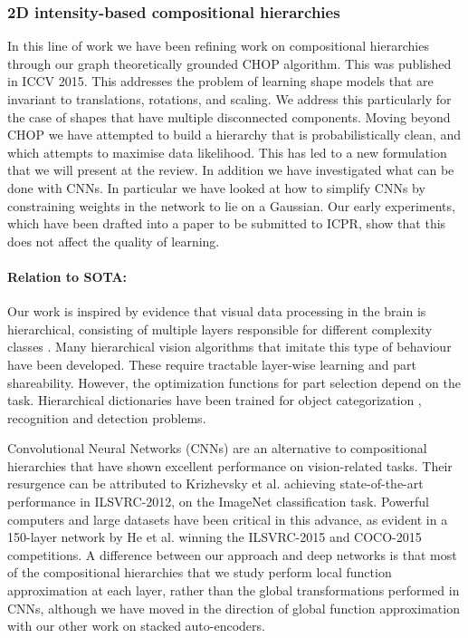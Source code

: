 \documentclass[a4paper,11pt,pdf]{../templates/pacmanreport}
\begin{document}
\subsubsection{2D intensity-based compositional hierarchies}

In this line of work we have been refining work on compositional hierarchies through our graph theoretically grounded CHOP algorithm. This was published in ICCV 2015. This addresses the problem of learning shape models that are invariant to translations, rotations, and scaling. We address this particularly for the case of shapes that have multiple disconnected components. Moving beyond CHOP we have attempted to build a hierarchy that is probabilistically clean, and which attempts to maximise data likelihood. This has led to a new formulation that we will present at the review. In addition we have investigated what can be done with CNNs. In particular we have looked at how to simplify CNNs by constraining weights in the network to lie on a Gaussian. Our early experiments, which have been drafted into a paper to be submitted to ICPR, show that this does not affect the quality of learning. 

\paragraph{Relation to SOTA:} 

Our work is inspired by evidence that visual data processing in the brain is hierarchical, consisting of multiple layers responsible for different complexity classes \cite{report:kruger}. Many hierarchical vision algorithms that imitate this type of behaviour \cite{rev1} have been developed. These require tractable layer-wise learning and part shareability. However, the optimization functions for part selection depend on the task. Hierarchical dictionaries have been trained for object categorization \cite{report:shen,fidler_cvpr07}, recognition \cite{report:recognition} and detection \cite{felz,report:kokkinos,girshick2014rcnn} problems. 

Convolutional Neural Networks (CNNs) \cite{Lenet} are an alternative to compositional hierarchies that have shown excellent performance on vision-related tasks. Their resurgence can be attributed to Krizhevsky et al. \cite{Krizhevsky} achieving state-of-the-art performance in ILSVRC-2012, on the ImageNet classification task. Powerful computers and large datasets have been critical in this advance, as evident in a 150-layer network by He et al. \cite{DBLP:journals/corr/HeZRS15} winning the ILSVRC-2015 and COCO-2015 competitions. A difference between our approach and deep networks is that most of the compositional hierarchies that we study perform local function approximation at each layer, rather than the global transformations performed in CNNs, although we have moved in the direction of global function approximation with our other work on stacked auto-encoders. 
\end{document}
